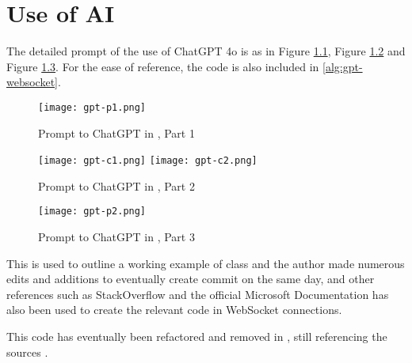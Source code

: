 \chapter{Use of AI}
The detailed prompt of the use of ChatGPT 4o \autocite{gpt-websocket} is as in Figure \ref{fig:gpt-websocket-1}, Figure \ref{fig:gpt-websocket-2} and Figure \ref{fig:gpt-websocket-3}. For the ease of reference, the code is also included in \ref{alg:gpt-websocket}.

\begin{figure}[!ht]
    \centering

    \texttt{[image: gpt-p1.png]}
    \caption[Prompt to ChatGPT in \autocite{gpt-websocket}, Part 1]{Prompt to ChatGPT in \autocite{gpt-websocket}, Part 1}
    \label{fig:gpt-websocket-1}
\end{figure}

\begin{figure}[!ht]
    \centering

    \texttt{[image: gpt-c1.png]}
    \texttt{[image: gpt-c2.png]}

    \caption[Prompt to ChatGPT in \autocite{gpt-websocket}, Part 2]{Prompt to ChatGPT in \autocite{gpt-websocket}, Part 2}
    \label{fig:gpt-websocket-2}
\end{figure}

\begin{figure}[!ht]
    \centering

    \texttt{[image: gpt-p2.png]}

    \caption[Prompt to ChatGPT in \autocite{gpt-websocket}, Part 3]{Prompt to ChatGPT in \autocite{gpt-websocket}, Part 3}
    \label{fig:gpt-websocket-3}
\end{figure}

This is used to outline a working example of  class and the author made numerous edits and additions to eventually create commit  on the same day, and other references such as StackOverflow \autocite{stackoverflow-websocket-demo, stackoverflow-websocket-demo-2} and the official Microsoft Documentation \autocite{dotnet-reference-clientwebsocket} has also been used to create the relevant code in WebSocket connections.

This code has eventually been refactored and removed in , still referencing the sources \autocite{stackoverflow-websocket-demo, stackoverflow-websocket-demo-2}.